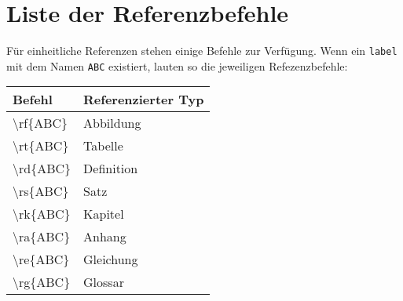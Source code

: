 \section{Liste der Referenzbefehle}

Für einheitliche Referenzen stehen einige Befehle zur Verfügung. Wenn ein
\verb!label! mit dem Namen \verb!ABC! existiert, lauten so die jeweiligen
Refezenzbefehle:

\begin{longtable}{>{\ttfamily}ll}
	Befehl & Referenzierter Typ \\\hline
	\textbackslash{}rf\{ABC\} & Abbildung \\
	\textbackslash{}rt\{ABC\} & Tabelle \\
	\textbackslash{}rd\{ABC\} & Definition \\
	\textbackslash{}rs\{ABC\} & Satz \\
	\textbackslash{}rk\{ABC\} & Kapitel \\
	\textbackslash{}ra\{ABC\} & Anhang \\
	\textbackslash{}re\{ABC\} & Gleichung \\
	\textbackslash{}rg\{ABC\} & Glossar \\
\end{longtable}
